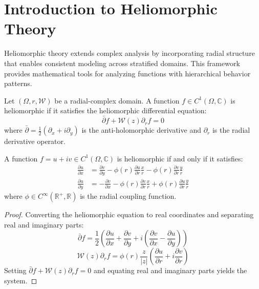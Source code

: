 \section{Introduction to Heliomorphic Theory}

Heliomorphic theory extends complex analysis by incorporating radial structure that enables consistent modeling across stratified domains. This framework provides mathematical tools for analyzing functions with hierarchical behavior patterns.

\begin{definition}
\label{def:heliomorphic_function}
Let $(\Omega, r, \mathcal{W})$ be a radial-complex domain. A function $f \in C^1(\Omega, \mathbb{C})$ is heliomorphic if it satisfies the heliomorphic differential equation:
\begin{equation}
\bar{\partial} f + \mathcal{W}(z) \partial_r f = 0
\end{equation}
where $\bar{\partial} = \frac{1}{2}(\partial_x + i\partial_y)$ is the anti-holomorphic derivative and $\partial_r$ is the radial derivative operator.
\end{definition}

\begin{theorem}
\label{thm:heliomorphic_characterization}
A function $f = u + iv \in C^1(\Omega, \mathbb{C})$ is heliomorphic if and only if it satisfies:
\begin{align}
\frac{\partial u}{\partial x} &= \frac{\partial v}{\partial y} - \phi(r) \frac{\partial u}{\partial r} \frac{x}{r} - \phi(r) \frac{\partial v}{\partial r} \frac{y}{r} \\
\frac{\partial u}{\partial y} &= -\frac{\partial v}{\partial x} - \phi(r) \frac{\partial v}{\partial r} \frac{x}{r} + \phi(r) \frac{\partial u}{\partial r} \frac{y}{r}
\end{align}
where $\phi \in C^\infty(\mathbb{R}^+, \mathbb{R})$ is the radial coupling function.
\end{theorem}

\begin{proof}
Converting the heliomorphic equation to real coordinates and separating real and imaginary parts:
$$\bar{\partial} f = \frac{1}{2}\left(\frac{\partial u}{\partial x} + \frac{\partial v}{\partial y} + i\left(\frac{\partial v}{\partial x} - \frac{\partial u}{\partial y}\right)\right)$$
$$\mathcal{W}(z) \partial_r f = \phi(r) \frac{z}{|z|} \left(\frac{\partial u}{\partial r} + i\frac{\partial v}{\partial r}\right)$$
Setting $\bar{\partial} f + \mathcal{W}(z) \partial_r f = 0$ and equating real and imaginary parts yields the system.
\end{proof}

